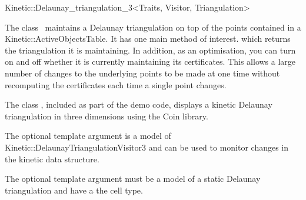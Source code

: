 

\begin{ccRefClass}{Kinetic::Delaunay_triangulation_3<Traits, Visitor, Triangulation>}  %


\ccDefinition
  
The class \ccRefName\ maintains a Delaunay triangulation on top of the
points contained in a Kinetic::ActiveObjectsTable. It has one main method
of interest.  which returns the triangulation it
is maintaining. In addition, as an optimisation, you can turn on and
off whether it is currently maintaining its certificates. This allows
a large number of changes to the underlying points to be made at one
time without recomputing the certificates each time a single point
changes.

The class , included as part
of the demo code, displays a kinetic Delaunay triangulation in three
dimensions using the Coin library.

The optional  template argument is a model of
Kinetic::DelaunayTriangulationVisitor3 and can be used to monitor
changes in the kinetic data structure.

The optional  template argument must be a model of
a static Delaunay triangulation and have
 a the cell
type.



\ccTypes


\ccCreation
{}  %


\end{ccRefClass}
